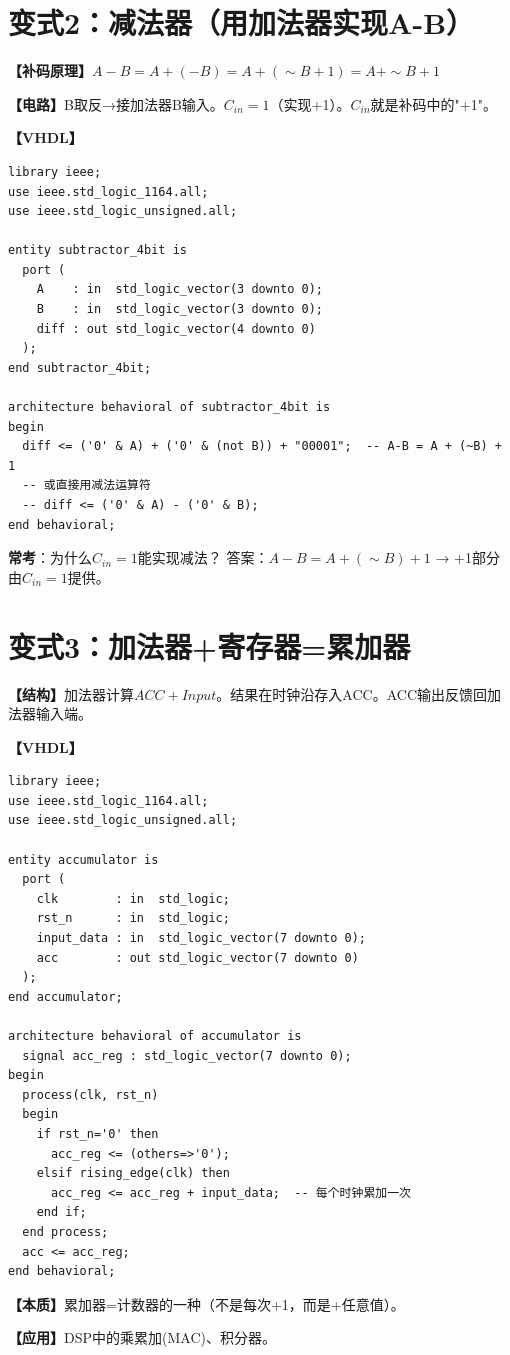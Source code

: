 \section{变式2：减法器（用加法器实现A-B）}

\begin{detailbox}[完整教学]
\textbf{【补码原理】}$A-B = A+(-B) = A+(\sim B+1) = A+\sim B+1$

\textbf{【电路】}B取反→接加法器B输入。$C_{in}=1$（实现+1）。$C_{in}$就是补码中的"+1"。

\textbf{【VHDL】}
\begin{lstlisting}[caption={减法器（用加法器实现A-B）}]
library ieee;
use ieee.std_logic_1164.all;
use ieee.std_logic_unsigned.all;

entity subtractor_4bit is
  port (
    A    : in  std_logic_vector(3 downto 0);
    B    : in  std_logic_vector(3 downto 0);
    diff : out std_logic_vector(4 downto 0)
  );
end subtractor_4bit;

architecture behavioral of subtractor_4bit is
begin
  diff <= ('0' & A) + ('0' & (not B)) + "00001";  -- A-B = A + (~B) + 1
  -- 或直接用减法运算符
  -- diff <= ('0' & A) - ('0' & B);
end behavioral;
\end{lstlisting}

\begin{examfocus}
\textbf{常考}：为什么$C_{in}=1$能实现减法？
答案：$A-B = A+(\sim B)+1$ → +1部分由$C_{in}=1$提供。
\end{examfocus}
\end{detailbox}


\section{变式3：加法器+寄存器=累加器}

\begin{detailbox}[完整教学]
\textbf{【结构】}加法器计算$ACC+Input$。结果在时钟沿存入ACC。ACC输出反馈回加法器输入端。

\textbf{【VHDL】}
\begin{lstlisting}[caption={累加器完整实现}]
library ieee;
use ieee.std_logic_1164.all;
use ieee.std_logic_unsigned.all;

entity accumulator is
  port (
    clk        : in  std_logic;
    rst_n      : in  std_logic;
    input_data : in  std_logic_vector(7 downto 0);
    acc        : out std_logic_vector(7 downto 0)
  );
end accumulator;

architecture behavioral of accumulator is
  signal acc_reg : std_logic_vector(7 downto 0);
begin
  process(clk, rst_n)
  begin
    if rst_n='0' then
      acc_reg <= (others=>'0');
    elsif rising_edge(clk) then
      acc_reg <= acc_reg + input_data;  -- 每个时钟累加一次
    end if;
  end process;
  acc <= acc_reg;
end behavioral;
\end{lstlisting}

\textbf{【本质】}累加器=计数器的一种（不是每次+1，而是+任意值）。

\textbf{【应用】}DSP中的乘累加(MAC)、积分器。
\end{detailbox}


